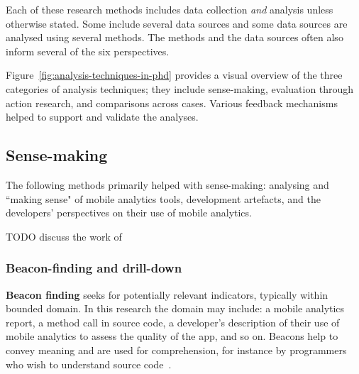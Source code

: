 Each of these research methods includes data collection \textit{and} analysis unless otherwise stated. Some include several data sources and some data sources are analysed using several methods. The methods and the data sources often also inform several of the six perspectives.

Figure~\ref{fig:analysis-techniques-in-phd} provides a visual overview of the three categories of analysis techniques; they include sense-making, evaluation through action research, and comparisons across cases. Various feedback mechanisms helped to support and validate the analyses. 


\subsection{Sense-making}
The following methods primarily helped with sense-making: analysing and ``making sense" of mobile analytics tools, development artefacts, and the developers' perspectives on their use of mobile analytics. 

TODO discuss the work of~\citep{naumer2008_sense_making}

\subsubsection{Beacon-finding and drill-down}
\textbf{Beacon finding} seeks for potentially relevant indicators, typically within bounded domain. In this research the domain may include: a mobile analytics report, a method call in source code, a developer's description of their use of mobile analytics to assess the quality of the app, and so on. Beacons help to convey meaning and are used for comprehension, for instance by programmers who wish to understand source code~\citep[page i]{crosby2002_roles_beacons_play_in_comprehension_etc}.

